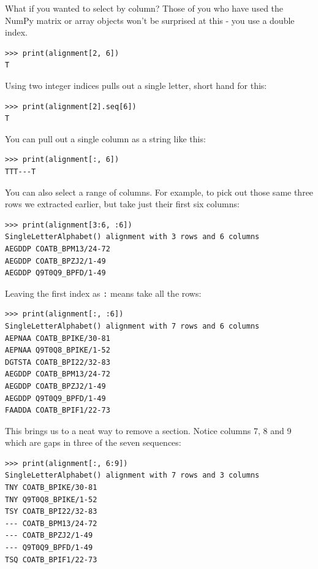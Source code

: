 \documentclass{report}
\begin{document}
What if you wanted to select by column? Those of you who have used the NumPy
matrix or array objects won't be surprised at this - you use a double index.

\begin{verbatim}
>>> print(alignment[2, 6])
T
\end{verbatim}

\noindent Using two integer indices pulls out a single letter, short hand for this:

\begin{verbatim}
>>> print(alignment[2].seq[6])
T
\end{verbatim}

You can pull out a single column as a string like this:

\begin{verbatim}
>>> print(alignment[:, 6])
TTT---T
\end{verbatim}

You can also select a range of columns. For example, to pick out those same
three rows we extracted earlier, but take just their first six columns:

\begin{verbatim}
>>> print(alignment[3:6, :6])
SingleLetterAlphabet() alignment with 3 rows and 6 columns
AEGDDP COATB_BPM13/24-72
AEGDDP COATB_BPZJ2/1-49
AEGDDP Q9T0Q9_BPFD/1-49
\end{verbatim}

Leaving the first index as \verb|:| means take all the rows:

\begin{verbatim}
>>> print(alignment[:, :6])
SingleLetterAlphabet() alignment with 7 rows and 6 columns
AEPNAA COATB_BPIKE/30-81
AEPNAA Q9T0Q8_BPIKE/1-52
DGTSTA COATB_BPI22/32-83
AEGDDP COATB_BPM13/24-72
AEGDDP COATB_BPZJ2/1-49
AEGDDP Q9T0Q9_BPFD/1-49
FAADDA COATB_BPIF1/22-73
\end{verbatim}

This brings us to a neat way to remove a section. Notice columns
7, 8 and 9 which are gaps in three of the seven sequences:

\begin{verbatim}
>>> print(alignment[:, 6:9])
SingleLetterAlphabet() alignment with 7 rows and 3 columns
TNY COATB_BPIKE/30-81
TNY Q9T0Q8_BPIKE/1-52
TSY COATB_BPI22/32-83
--- COATB_BPM13/24-72
--- COATB_BPZJ2/1-49
--- Q9T0Q9_BPFD/1-49
TSQ COATB_BPIF1/22-73
\end{verbatim}
\end{document}

